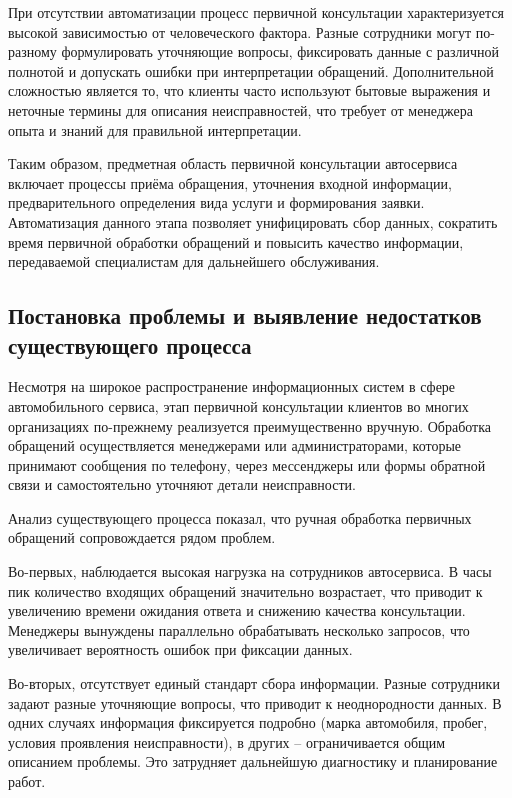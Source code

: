 \documentclass[14pt,a4paper]{extarticle}
\numberwithin{figure}{section}
\numberwithin{table}{section}
\begin{document}
При отсутствии автоматизации процесс первичной консультации
характеризуется высокой зависимостью от человеческого фактора. Разные
сотрудники могут по-разному формулировать уточняющие вопросы,
фиксировать данные с различной полнотой и допускать ошибки при
интерпретации обращений. Дополнительной сложностью является то, что
клиенты часто используют бытовые выражения и неточные термины для
описания неисправностей, что требует от менеджера опыта и знаний для
правильной интерпретации.

Таким образом, предметная область первичной консультации автосервиса
включает процессы приёма обращения, уточнения входной информации,
предварительного определения вида услуги и формирования заявки.
Автоматизация данного этапа позволяет унифицировать сбор данных,
сократить время первичной обработки обращений и повысить качество
информации, передаваемой специалистам для дальнейшего обслуживания.

\subsection{Постановка проблемы и выявление недостатков
существующего
процесса}\label{ux43fux43eux441ux442ux430ux43dux43eux432ux43aux430-ux43fux440ux43eux431ux43bux435ux43cux44b-ux438-ux432ux44bux44fux432ux43bux435ux43dux438ux435-ux43dux435ux434ux43eux441ux442ux430ux442ux43aux43eux432-ux441ux443ux449ux435ux441ux442ux432ux443ux44eux449ux435ux433ux43e-ux43fux440ux43eux446ux435ux441ux441ux430}

Несмотря на широкое распространение информационных систем в сфере
автомобильного сервиса, этап первичной консультации клиентов во многих
организациях по-прежнему реализуется преимущественно вручную. Обработка
обращений осуществляется менеджерами или администраторами, которые
принимают сообщения по телефону, через мессенджеры или формы обратной
связи и самостоятельно уточняют детали неисправности.

Анализ существующего процесса показал, что ручная обработка первичных
обращений сопровождается рядом проблем.

Во-первых, наблюдается высокая нагрузка на сотрудников автосервиса. В
часы пик количество входящих обращений значительно возрастает, что
приводит к увеличению времени ожидания ответа и снижению качества
консультации. Менеджеры вынуждены параллельно обрабатывать несколько
запросов, что увеличивает вероятность ошибок при фиксации данных.

Во-вторых, отсутствует единый стандарт сбора информации. Разные
сотрудники задают разные уточняющие вопросы, что приводит к
неоднородности данных. В одних случаях информация фиксируется подробно
(марка автомобиля, пробег, условия проявления неисправности), в других
-- ограничивается общим описанием проблемы. Это затрудняет дальнейшую
диагностику и планирование работ.
\end{document}
